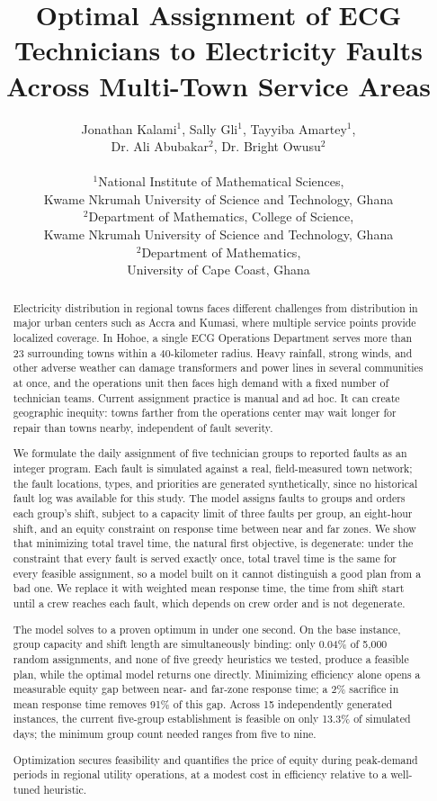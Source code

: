 \documentclass[11pt]{article}
\title{\bfseries Optimal Assignment of ECG Technicians to Electricity Faults Across Multi-Town Service Areas\\}
\author{
\centering
\begin{tabular}{c}
Jonathan Kalami$^{1}$, Sally Gli$^{1}$, Tayyiba Amartey$^{1}$,\\
Dr. Ali Abubakar$^{2}$, Dr. Bright Owusu$^{2}$ \\
\\
$^{1}$National Institute of Mathematical Sciences,\\ Kwame Nkrumah University of Science and Technology, Ghana\\
$^{2}$Department of Mathematics, College of Science,\\ Kwame Nkrumah University of Science and Technology, Ghana \\
$^{2}$Department of Mathematics,\\ University of Cape Coast, Ghana
\end{tabular}
}
\date{}
\begin{document}
\maketitle

\begin{abstract}
\noindent Electricity distribution in regional towns faces different challenges from distribution in major urban centers such as Accra and Kumasi, where multiple service points provide localized coverage. In Hohoe, a single ECG Operations Department serves more than 23 surrounding towns within a 40-kilometer radius. Heavy rainfall, strong winds, and other adverse weather can damage transformers and power lines in several communities at once, and the operations unit then faces high demand with a fixed number of technician teams. Current assignment practice is manual and ad hoc. It can create geographic inequity: towns farther from the operations center may wait longer for repair than towns nearby, independent of fault severity.

\vspace{0.25cm}
\noindent We formulate the daily assignment of five technician groups to reported faults as an integer program. Each fault is simulated against a real, field-measured town network; the fault locations, types, and priorities are generated synthetically, since no historical fault log was available for this study. The model assigns faults to groups and orders each group's shift, subject to a capacity limit of three faults per group, an eight-hour shift, and an equity constraint on response time between near and far zones. We show that minimizing total travel time, the natural first objective, is degenerate: under the constraint that every fault is served exactly once, total travel time is the same for every feasible assignment, so a model built on it cannot distinguish a good plan from a bad one. We replace it with weighted mean response time, the time from shift start until a crew reaches each fault, which depends on crew order and is not degenerate.

\vspace{0.25cm}
\noindent The model solves to a proven optimum in under one second. On the base instance, group capacity and shift length are simultaneously binding: only 0.04\% of 5{,}000 random assignments, and none of five greedy heuristics we tested, produce a feasible plan, while the optimal model returns one directly. Minimizing efficiency alone opens a measurable equity gap between near- and far-zone response time; a 2\% sacrifice in mean response time removes 91\% of this gap. Across 15 independently generated instances, the current five-group establishment is feasible on only 13.3\% of simulated days; the minimum group count needed ranges from five to nine.

\vspace{0.25cm}
\noindent Optimization secures feasibility and quantifies the price of equity during peak-demand periods in regional utility operations, at a modest cost in efficiency relative to a well-tuned heuristic.
\end{abstract}
\end{document}
